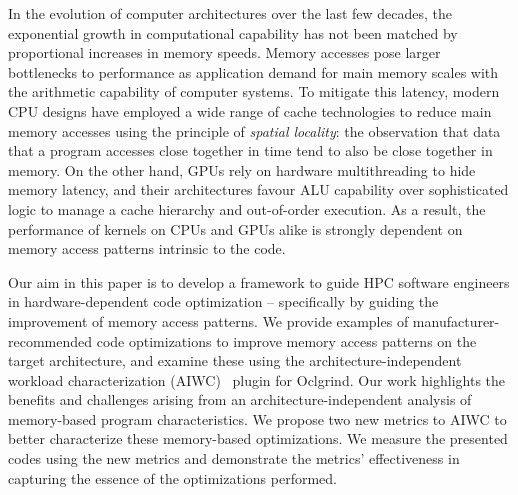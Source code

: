 \documentclass[review=false, sigchi]{acmart}
\begin{document}
	In the evolution of computer architectures over the last few decades, the exponential growth in computational capability has not been matched by proportional increases in memory speeds\cite{hennessycomparch}.
	Memory accesses pose larger bottlenecks to performance as application demand for main memory scales with the arithmetic capability of computer systems.
	To mitigate this latency, modern CPU designs have employed a wide range of cache technologies to reduce main memory accesses using the principle of \emph{spatial locality}: the observation that data that a program accesses close together in time tend to also be close together in memory.
	On the other hand, GPUs rely on hardware multithreading to hide memory latency, and their architectures favour ALU capability over sophisticated logic to manage a cache hierarchy and out-of-order execution. As a result, the performance of kernels on CPUs and GPUs alike is strongly dependent on memory access patterns intrinsic to the code. %
	
	
	
	Our aim in this paper is to develop a framework to guide HPC software engineers in hardware-dependent code optimization -- specifically by guiding the improvement of memory access patterns.
	We provide examples of manufacturer-recommended code optimizations to improve memory access patterns on the target architecture, and examine these using the architecture-independent workload characterization (AIWC)~\cite{beauaiwc} plugin for Oclgrind.
	Our work highlights the benefits and challenges arising from an architecture-independent analysis of memory-based program characteristics.
	We propose two new metrics to AIWC to better characterize these memory-based optimizations.
	We measure the presented codes using the new metrics and demonstrate the metrics' effectiveness in capturing the essence of the optimizations performed.
	
\end{document}
